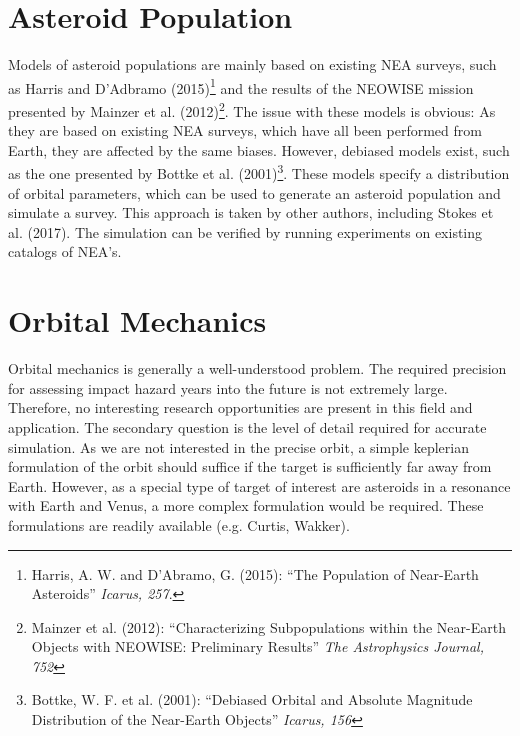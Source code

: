 \documentclass[a4paper,10pt]{article}
\begin{document}
\section{Asteroid Population}
Models of asteroid populations are mainly based on existing NEA surveys, such as Harris and D'Adbramo (2015)\footnote{Harris, A. W. and D'Abramo, G. (2015): ``The Population of Near-Earth Asteroids'' \textit{Icarus, 257}.} and the results of the NEOWISE mission presented by Mainzer et al. (2012)\footnote{Mainzer et al. (2012): ``Characterizing Subpopulations within the Near-Earth Objects with NEOWISE: Preliminary Results'' \textit{The Astrophysics Journal, 752}}. The issue with these models is obvious: As they are based on existing NEA surveys, which have all been performed from Earth, they are affected by the same biases. However, debiased models exist, such as the one presented by Bottke et al. (2001)\footnote{Bottke, W. F. et al. (2001): ``Debiased Orbital and Absolute Magnitude Distribution of the Near-Earth Objects'' \textit{Icarus, 156}}. These models specify a distribution of orbital parameters, which can be used to generate an asteroid population and simulate a survey. This approach is taken by other authors, including Stokes et al. (2017). The simulation can be verified by running experiments on existing catalogs of NEA's.

\section{Orbital Mechanics}
Orbital mechanics is generally a well-understood problem. The required precision for assessing impact hazard years into the future is not extremely large. Therefore, no interesting research opportunities are present in this field and application. The secondary question is the level of detail required for accurate simulation. As we are not interested in the precise orbit, a simple keplerian formulation of the orbit should suffice if the target is sufficiently far away from Earth. However, as a special type of target of interest are asteroids in a resonance with Earth and Venus, a more complex formulation would be required. These formulations are readily available (e.g. Curtis, Wakker).
\end{document}
